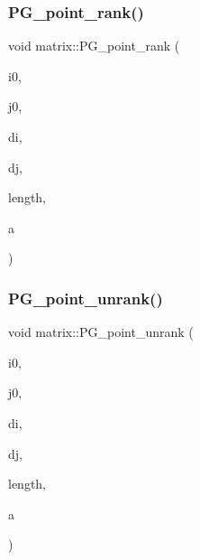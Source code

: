 \mbox{\label{classmatrix_a482c95dbcf39d23ea96bca94e2a3f8cb}} 
\subsubsection{\texorpdfstring{P\+G\+\_\+point\+\_\+rank()}{PG\_point\_rank()}}
{\footnotesize\ttfamily void matrix\+::\+P\+G\+\_\+point\+\_\+rank (\begin{DoxyParamCaption}\item[{\mbox{\hyperlink{galois_8h_a09fddde158a3a20bd2dcadb609de11dc}{I\+NT}}}]{i0,  }\item[{\mbox{\hyperlink{galois_8h_a09fddde158a3a20bd2dcadb609de11dc}{I\+NT}}}]{j0,  }\item[{\mbox{\hyperlink{galois_8h_a09fddde158a3a20bd2dcadb609de11dc}{I\+NT}}}]{di,  }\item[{\mbox{\hyperlink{galois_8h_a09fddde158a3a20bd2dcadb609de11dc}{I\+NT}}}]{dj,  }\item[{\mbox{\hyperlink{galois_8h_a09fddde158a3a20bd2dcadb609de11dc}{I\+NT}}}]{length,  }\item[{\mbox{\hyperlink{galois_8h_a09fddde158a3a20bd2dcadb609de11dc}{I\+NT}} \&}]{a }\end{DoxyParamCaption})}

\mbox{\label{classmatrix_a5e3395e0dabdef2f693d463814577f5d}} 
\subsubsection{\texorpdfstring{P\+G\+\_\+point\+\_\+unrank()}{PG\_point\_unrank()}}
{\footnotesize\ttfamily void matrix\+::\+P\+G\+\_\+point\+\_\+unrank (\begin{DoxyParamCaption}\item[{\mbox{\hyperlink{galois_8h_a09fddde158a3a20bd2dcadb609de11dc}{I\+NT}}}]{i0,  }\item[{\mbox{\hyperlink{galois_8h_a09fddde158a3a20bd2dcadb609de11dc}{I\+NT}}}]{j0,  }\item[{\mbox{\hyperlink{galois_8h_a09fddde158a3a20bd2dcadb609de11dc}{I\+NT}}}]{di,  }\item[{\mbox{\hyperlink{galois_8h_a09fddde158a3a20bd2dcadb609de11dc}{I\+NT}}}]{dj,  }\item[{\mbox{\hyperlink{galois_8h_a09fddde158a3a20bd2dcadb609de11dc}{I\+NT}}}]{length,  }\item[{\mbox{\hyperlink{galois_8h_a09fddde158a3a20bd2dcadb609de11dc}{I\+NT}}}]{a }\end{DoxyParamCaption})}

